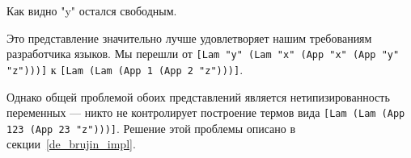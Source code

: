 Как видно "y" остался свободным.

Это представление значительно лучше удовлетворяет нашим требованиям разработчика языков. Мы перешли от
\lstinline{[Lam "y" (Lam "x" (App "x" (App "y" "z")))]} к \lstinline{[Lam (Lam (App 1 (App 2 "z")))]}.

Однако общей проблемой обоих представлений является нетипизированность переменных --- никто не контролирует построение термов вида \lstinline{[Lam (Lam (App 123 (App 23 "z")))]}. Решение этой проблемы описано в секции~\ref{de_brujin_impl}.









